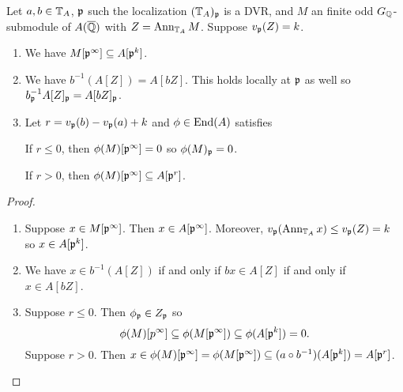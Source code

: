 \documentclass[thesis.tex]{subfiles}
\begin{document}
\begin{lemma}
    Let $a,b\in \mathbb{T}_A$, $\mathfrak{p}$ such the localization $(\mathbb{T}_A)_{\mathfrak{p}}$ is a DVR, and
    $M$ an finite odd $G_{\mathbb{Q}}$-submodule of $A(\overline{\mathbb{Q}})$ with $Z=\operatorname{Ann}_{\mathbb{T}_A} M$.
    Suppose $v_{\mathfrak{p}}(Z)=k$.
    \begin{enumerate}
        \item
            We have $M[\mathfrak{p}^\infty]\subseteq A[\mathfrak{p}^k]$.
        \item
            We have $b^{-1}(A[Z])=A[bZ]$. This holds locally at $\mathfrak{p}$ as well so
            $b_{\mathfrak{p}} ^{-1} A[Z]_{\mathfrak{p}} = A[bZ]_{\mathfrak{p}}$.
        \item
            Let $r=v_{\mathfrak{p}}(b)-v_{\mathfrak{p}}(a)+k$ and $\phi\in \operatorname{End}(A)$ satisfies
            
            If $r\leq
            0$, then $\phi(M)[\mathfrak{p}^\infty]=0$ so $\phi(M)_{\mathfrak{p}}=0$.

            If $r>0$, then $\phi(M)[\mathfrak{p}^\infty]\subseteq A[\mathfrak{p}^r]$.
    \end{enumerate}
\end{lemma}
\begin{proof}
    \mbox{}
    \begin{enumerate}
        \item
            Suppose $x\in M[\mathfrak{p}^\infty]$. Then $x\in A[\mathfrak{p}^\infty]$. Moreover,
            $v_{\mathfrak{p}}(\operatorname{Ann}_{\mathbb{T}_A} x) \leq v_{\mathfrak{p}}(Z) = k$ so $x\in A[\mathfrak{p}^k]$.
        \item
            We have $x\in b^{-1}(A[Z])$ if and only if $bx \in A[Z]$ if and
            only if $x\in A[bZ]$.
        \item
            Suppose $r\leq 0$. Then $\phi_{\mathfrak{p}} \in Z_{\mathfrak{p}}$ so
            \[
                \phi(M)[p^\infty]\subseteq \phi(M[\mathfrak{p}^\infty])
                \subseteq \phi(A[\mathfrak{p}^k]) = 0.
            \]
            Suppose $r>0$. Then $x\in \phi(M)[\mathfrak{p}^\infty] =
            \phi(M[\mathfrak{p}^\infty])\subseteq (a\circ
            b^{-1})(A[\mathfrak{p}^k])=A[\mathfrak{p}^r]$.
    \end{enumerate}
\end{proof}
\end{document}

